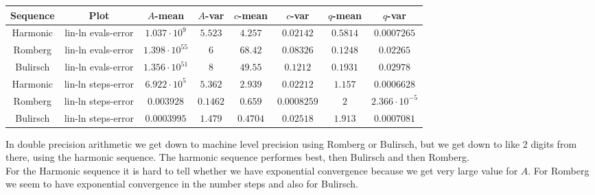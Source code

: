 \begin{table}[H]
    \centering
    \small
    \begin{tabular}{c|c||c|c|c|c|c	|c}
Sequence & Plot & \(A\)-mean & \(A\)-var & \(c\)-mean & \(c\)-var & \(q\)-mean & \(q\)-var\\\hline
\rowcolor{yellow}
Harmonic & lin-ln evals-error & \(1.037\cdot 10^9\) & \(5.523\) & \(4.257\) & \(0.02142\) & \(0.5814\) & \(0.0007265\) \\
\rowcolor{red}
Romberg & lin-ln evals-error & \(1.398\cdot 10^{55}\) & \(6\) & \(68.42\) & \(0.08326\) & \(0.1248\) & \(0.02265\) \\
\rowcolor{red}
Bulirsch & lin-ln evals-error & \(1.356\cdot 10^{51}\) & \(8\) & \(49.55\) & \(0.1212\) & \(0.1931\) & \(0.02978\) \\
\rowcolor{yellow}
Harmonic & lin-ln steps-error & \(6.922\cdot 10^5\) & \(5.362\) & \(2.939\) & \(0.02212\) & \(1.157\) & \(0.0006628\) \\
\rowcolor{green}
Romberg & lin-ln steps-error & \(0.003928\) & \(0.1462\) & \(0.659\) & \(0.0008259\) & \(2\) & \(2.366\cdot 10^{-5}\) \\
\rowcolor{green}
Bulirsch & lin-ln steps-error & \(0.0003995\) & \(1.479\) & \(0.4704\) & \(0.02518\) & \(1.913\) & \(0.0007081\) \\
    \end{tabular}
    \label{tab:my_label}
\end{table}

In double precision arithmetic we get down to machine level precision using Romberg or Bulirsch, but we get down to like \(2\) digits from there, using the harmonic sequence. The harmonic sequence performes best, then Bulirsch and then Romberg.\\

For the Harmonic sequence it is hard to tell whether we have exponential convergence because we get very large value for \(A\). For Romberg we seem to have exponential convergence in the number steps and also for Bulirsch.

